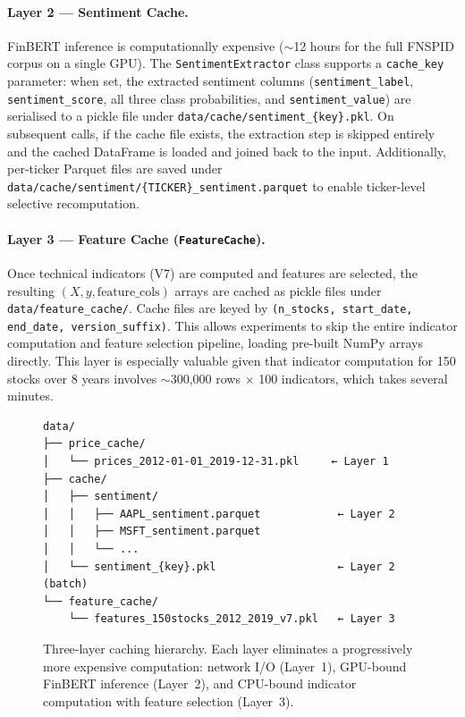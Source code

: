 \paragraph{Layer 2 --- Sentiment Cache.}
FinBERT inference is computationally expensive (${\sim}$12 hours for the full
FNSPID corpus on a single GPU).  The \texttt{SentimentExtractor} class supports
a \texttt{cache\_key} parameter: when set, the extracted sentiment columns
(\texttt{sentiment\_label}, \texttt{sentiment\_score}, all three class
probabilities, and \texttt{sentiment\_value}) are serialised to a pickle file
under \texttt{data/cache/sentiment\_\{key\}.pkl}.  On subsequent calls, if the
cache file exists, the extraction step is skipped entirely and the cached
DataFrame is loaded and joined back to the input.  Additionally, per-ticker
Parquet files are saved under \texttt{data/cache/sentiment/\{TICKER\}\_sentiment.parquet}
to enable ticker-level selective recomputation.

\paragraph{Layer 3 --- Feature Cache (\texttt{FeatureCache}).}
Once technical indicators (V7) are computed and features are selected, the
resulting $(X, y, \text{feature\_cols})$ arrays are cached as pickle files under
\texttt{data/feature\_cache/}.  Cache files are keyed by
\texttt{(n\_stocks, start\_date, end\_date, version\_suffix)}.  This allows
experiments to skip the entire indicator computation and feature selection
pipeline, loading pre-built NumPy arrays directly.  This layer is especially
valuable given that indicator computation for 150 stocks over 8 years involves
${\sim}$300{,}000 rows $\times$ 100 indicators, which takes several minutes.

\begin{figure}[htbp]
\centering
\begin{verbatim}
data/
├── price_cache/
│   └── prices_2012-01-01_2019-12-31.pkl     ← Layer 1
├── cache/
│   ├── sentiment/
│   │   ├── AAPL_sentiment.parquet            ← Layer 2
│   │   ├── MSFT_sentiment.parquet
│   │   └── ...
│   └── sentiment_{key}.pkl                   ← Layer 2 (batch)
└── feature_cache/
    └── features_150stocks_2012_2019_v7.pkl   ← Layer 3
\end{verbatim}
\caption{Three-layer caching hierarchy.  Each layer eliminates a progressively
more expensive computation: network I/O (Layer~1), GPU-bound FinBERT inference
(Layer~2), and CPU-bound indicator computation with feature selection (Layer~3).}
\label{fig:cache-hierarchy}
\end{figure}

